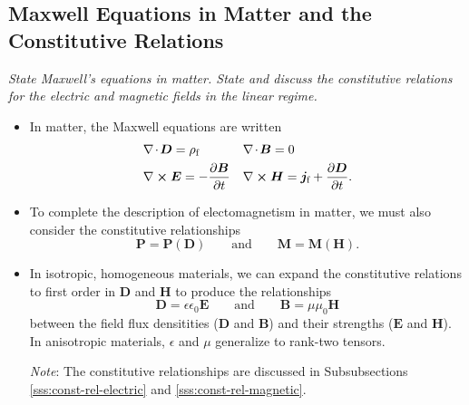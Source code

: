 \documentclass[11pt, a4paper]{article}
\renewcommand{\vec}[1]{\bm{#1}} %
\newcommand{\E}{\vec{E}} %
\newcommand{\D}{\vec{D}}  %
\newcommand{\B}{\vec{B}} %
\renewcommand{\H}{\vec{H}}  %
\renewcommand{\P}{\vec{P}}  %
\newcommand{\M}{\vec{M}}  %
\newcommand{\e}{\epsilon}
\newcommand{\ee}{\epsilon_{0}}  %
\newcommand{\mm}{\mu_{0}}  %
\renewcommand{\j}{\vec{j}}  %
\renewcommand{\div}{\nabla \mspace{-2mu} \cdot \mspace{-2mu}}
\renewcommand{\curl}{\nabla \cross}
\begin{document}
    
    
\subsection{Maxwell Equations in Matter and the Constitutive Relations}
\textit{State Maxwell's equations in matter. State and discuss the constitutive relations for the electric and magnetic fields in the linear regime.}

\begin{itemize}
	\item In matter, the Maxwell equations are written
	\begin{align*}
		& \div \D = \rho_{\text{f}} && \div \B = 0\\
		& \curl \E = - \pdv{\B}{t} &&  \curl \H = \j_{\text{f}} + \pdv{\D}{t}.
	\end{align*}
	
    \item To complete the description of electomagnetism in matter, we must also consider the constitutive relationships
    \begin{equation*}
        \P = \P(\D) \qquad \text{and} \qquad \M = \M(\H).
    \end{equation*}
    
    \item In isotropic, homogeneous materials, we can expand the constitutive relations to first order in $ \D $ and $ \H $ to produce the relationships
    \begin{equation*}
        \D = \e \ee \E \qquad \text{and} \qquad \B = \mu \mm \H
    \end{equation*}
    between the field flux densitities ($ \D $ and $ \B $) and their strengths ($ \E $ and $ \H $).
	In anisotropic materials, $ \e $ and $ \mu $  generalize to rank-two tensors.

    \vspace{2mm}
    \textit{Note}: The constitutive relationships are discussed in Subsubsections \ref{sss:const-rel-electric} and \ref{sss:const-rel-magnetic}.
	
\end{itemize}
\end{document}
